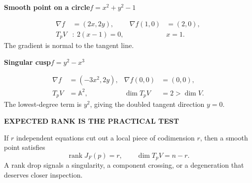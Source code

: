 \documentclass[9pt,a4paper]{extarticle}
\DeclareMathOperator{\rank}{rank}
\newcommand{\A}{\mathbb{A}}
\newcommand{\eyebrow}[1]{{\fontsize{7.2}{8}\selectfont\bfseries\color{teal}\MakeUppercase{#1}}}
\begin{document}
\vspace{5pt}
\begin{minipage}[t]{.485\textwidth}
\begin{quietbox}
\textbf{Smooth point on a circle}\hfill $f=x^2+y^2-1$\par
\begin{center}
\end{center}
\begin{align*}
\nabla f&=(2x,2y), & \nabla f(1,0)&=(2,0),\\
T_pV&:\ 2(x-1)=0, & &x=1.
\end{align*}
The gradient is normal to the tangent line.
\end{quietbox}
\end{minipage}\hfill
\begin{minipage}[t]{.485\textwidth}
\begin{quietbox}
\textbf{Singular cusp}\hfill $f=y^2-x^3$\par
\begin{center}
\end{center}
\begin{align*}
\nabla f&=(-3x^2,2y), & \nabla f(0,0)&=(0,0),\\
T_pV&=\A^2, & \dim T_pV&=2>\dim V.
\end{align*}
The lowest-degree term is $y^2$, giving the doubled tangent direction $y=0$.
\end{quietbox}
\end{minipage}

\vspace{6pt}
\begin{goldbox}
\eyebrow{Expected rank is the practical test}\par\vspace{2pt}
If $r$ independent equations cut out a local piece of codimension $r$, then a smooth point satisfies
\[
\rank J_F(p)=r,
\qquad
\dim T_pV=n-r.
\]
A rank drop signals a singularity, a component crossing, or a degeneration that deserves closer inspection.
\end{goldbox}
\newpage
\end{document}
